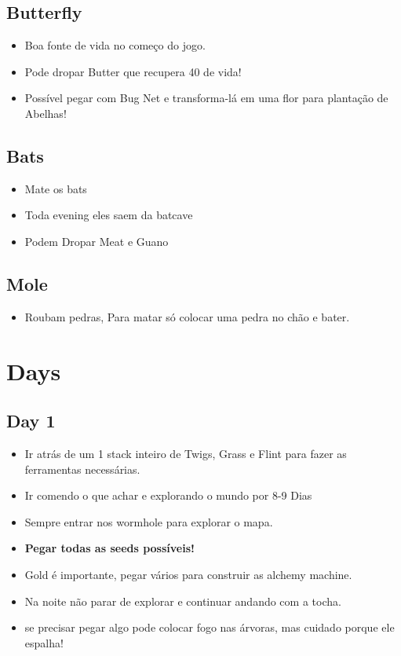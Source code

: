 \documentclass{article}
\begin{document}
\subsection*{Butterfly}
\begin{itemize}
    \item Boa fonte de vida no começo do jogo.
    \item Pode dropar Butter que recupera 40 de vida!
    \item Possível pegar com Bug Net e transforma-lá em uma flor para plantação de Abelhas!
\end{itemize}


\subsection*{Bats}
\begin{itemize}
    \item Mate os bats
    \item Toda evening eles saem da batcave
    \item Podem Dropar Meat e Guano
\end{itemize}

\subsection{Mole}
\begin{itemize}
    \item Roubam pedras, Para matar só colocar uma pedra no chão e bater.
\end{itemize}



\section{Days}


\subsection{Day 1}
\begin{itemize}
\item Ir atrás de um 1 stack inteiro de Twigs, Grass e Flint para fazer as ferramentas necessárias.
\item Ir comendo o que achar e explorando o mundo por 8-9 Dias \\
\item Sempre entrar nos wormhole para explorar o mapa.\\
\item \textbf{Pegar todas as seeds possíveis!}\\
\item Gold é importante, pegar vários para construir as alchemy machine.\\
\item Na noite não parar de explorar e continuar andando com a tocha.
\item se precisar pegar algo pode colocar fogo nas árvoras, mas cuidado porque ele espalha!
\end{itemize}
\end{document}
